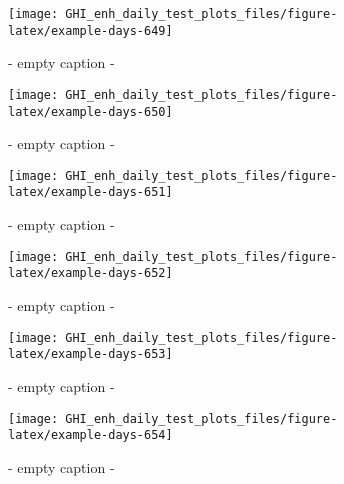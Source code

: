 \documentclass[
  10pt,
  a4paper,oneside]{article}
\begin{document}
\begin{figure}[H]

{\centering \texttt{[image: GHI\_enh\_daily\_test\_plots\_files/figure-latex/example-days-649]} 

}

\caption{ - empty caption - }\label{fig:example-days-649}
\end{figure}

\begin{figure}[H]

{\centering \texttt{[image: GHI\_enh\_daily\_test\_plots\_files/figure-latex/example-days-650]} 

}

\caption{ - empty caption - }\label{fig:example-days-650}
\end{figure}

\begin{figure}[H]

{\centering \texttt{[image: GHI\_enh\_daily\_test\_plots\_files/figure-latex/example-days-651]} 

}

\caption{ - empty caption - }\label{fig:example-days-651}
\end{figure}

\begin{figure}[H]

{\centering \texttt{[image: GHI\_enh\_daily\_test\_plots\_files/figure-latex/example-days-652]} 

}

\caption{ - empty caption - }\label{fig:example-days-652}
\end{figure}

\begin{figure}[H]

{\centering \texttt{[image: GHI\_enh\_daily\_test\_plots\_files/figure-latex/example-days-653]} 

}

\caption{ - empty caption - }\label{fig:example-days-653}
\end{figure}

\begin{figure}[H]

{\centering \texttt{[image: GHI\_enh\_daily\_test\_plots\_files/figure-latex/example-days-654]} 

}

\caption{ - empty caption - }\label{fig:example-days-654}
\end{figure}
\end{document}
